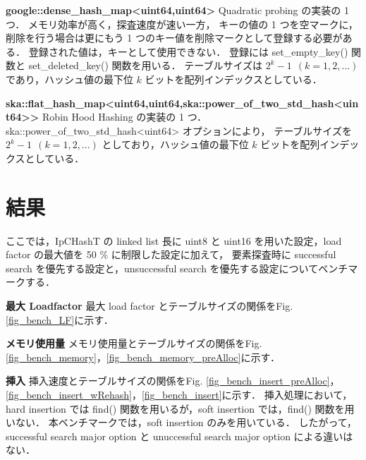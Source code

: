 %
{\bf google::dense\_hash\_map<uint64,uint64>}
\samepage\newline\indent
Quadratic probing の実装の 1 つ．
メモリ効率が高く，探査速度が速い一方，
キーの値の 1 つを空マークに，削除を行う場合は更にもう 1 つのキー値を削除マークとして登録する必要がある．
登録された値は，キーとして使用できない．
登録には set\_empty\_key() 関数と set\_deleted\_key() 関数を用いる．
テーブルサイズは $2^k-1\ \ (k=1,2,...)$ であり，ハッシュ値の最下位 $k$ ビットを配列インデックスとしている．
\leavevmode \newline

%
{\bf ska::flat\_hash\_map<uint64,uint64,ska::power\_of\_two\_std\_hash<uint64>>}
\samepage\newline\indent
Robin Hood Hashing の実装の 1 つ．
ska::power\_of\_two\_std\_hash<uint64> オプションにより，
テーブルサイズを $2^k-1\ \ (k=1,2,...)$ としており，ハッシュ値の最下位 $k$ ビットを配列インデックスとしている．
\leavevmode \newline


\section{結果}
ここでは，IpCHashT の linked list 長に uint8 と uint16 を用いた設定，load factor の最大値を 50 \% に制限した設定に加えて，
要素探査時に successful search を優先する設定と，unsuccessful search を優先する設定についてベンチマークする．
\leavevmode \newline

%
{\bf 最大 Loadfactor}
\samepage\newline\indent
最大 load factor とテーブルサイズの関係をFig. \ref{fig_bench_LF}に示す．
\leavevmode \newline

%
{\bf メモリ使用量}
\samepage\newline\indent
メモリ使用量とテーブルサイズの関係をFig. \ref{fig_bench_memory}，\ref{fig_bench_memory_preAlloc}に示す．
\leavevmode \newline

%
{\bf 挿入}
\samepage\newline\indent
挿入速度とテーブルサイズの関係をFig. 
\ref{fig_bench_insert_preAlloc}，\ref{fig_bench_insert_wRehash}，\ref{fig_bench_insert}に示す．
挿入処理において，hard insertion では find() 関数を用いるが，soft insertion では，find() 関数を用いない．
本ベンチマークでは，soft insertion のみを用いている．
したがって，successful search major option と unuccessful search major option による違いはない．
\leavevmode \newline

